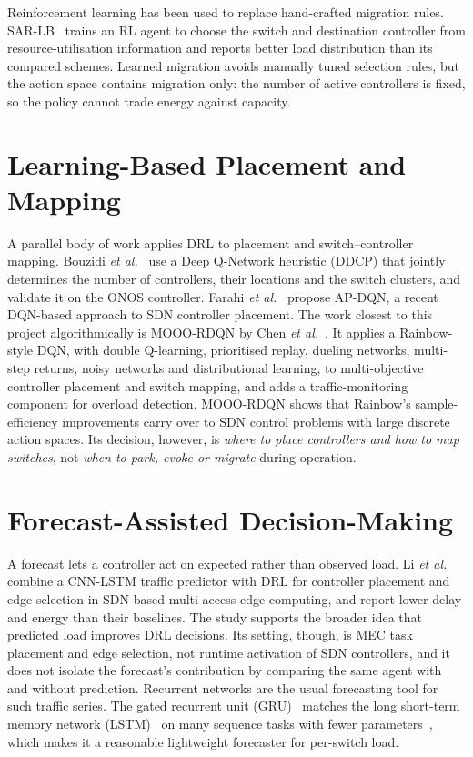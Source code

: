 Reinforcement learning has been used to replace hand-crafted migration rules. SAR-LB~\cite{yeo2021sarlb} trains an RL agent to choose the switch and destination controller from resource-utilisation information and reports better load distribution than its compared schemes. Learned migration avoids manually tuned selection rules, but the action space contains migration only: the number of active controllers is fixed, so the policy cannot trade energy against capacity.

\section{Learning-Based Placement and Mapping}
\label{sec:rw-drl-cpp}

A parallel body of work applies DRL to placement and switch--controller mapping. Bouzidi \emph{et al.}~\cite{bouzidi2022ddcp} use a Deep Q-Network heuristic (DDCP) that jointly determines the number of controllers, their locations and the switch clusters, and validate it on the ONOS controller. Farahi \emph{et al.}~\cite{farahi2026apdqn} propose AP-DQN, a recent DQN-based approach to SDN controller placement. The work closest to this project algorithmically is MOOO-RDQN by Chen \emph{et al.}~\cite{chen2025mooo}. It applies a Rainbow-style DQN, with double Q-learning, prioritised replay, dueling networks, multi-step returns, noisy networks and distributional learning, to multi-objective controller placement and switch mapping, and adds a traffic-monitoring component for overload detection. MOOO-RDQN shows that Rainbow's sample-efficiency improvements carry over to SDN control problems with large discrete action spaces. Its decision, however, is \emph{where to place controllers and how to map switches}, not \emph{when to park, evoke or migrate} during operation.

\section{Forecast-Assisted Decision-Making}
\label{sec:rw-forecast}

A forecast lets a controller act on expected rather than observed load. Li \emph{et al.}~\cite{li2024mec} combine a CNN-LSTM traffic predictor with DRL for controller placement and edge selection in SDN-based multi-access edge computing, and report lower delay and energy than their baselines. The study supports the broader idea that predicted load improves DRL decisions. Its setting, though, is MEC task placement and edge selection, not runtime activation of SDN controllers, and it does not isolate the forecast's contribution by comparing the same agent with and without prediction. Recurrent networks are the usual forecasting tool for such traffic series. The gated recurrent unit (GRU)~\cite{cho2014gru} matches the long short-term memory network (LSTM)~\cite{hochreiter1997lstm} on many sequence tasks with fewer parameters~\cite{chung2014gru}, which makes it a reasonable lightweight forecaster for per-switch load.

